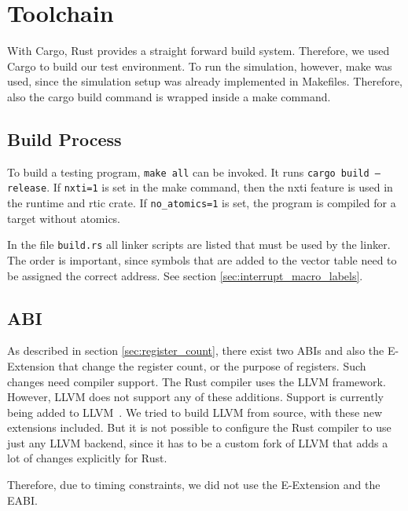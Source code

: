 \section{Toolchain}
With Cargo, Rust provides a straight forward build system. Therefore, we used Cargo to build our test environment. To run the simulation, however, make was used, since the simulation setup was already implemented in Makefiles. Therefore, also the cargo build command is wrapped inside a make command.

\subsection{Build Process}
To build a testing program, \texttt{make all} can be invoked.
It runs \texttt{cargo build ---release}.  If \texttt{nxti=1} is set in the make command, then the nxti feature is used in the runtime and \gls{rtic} crate. If \texttt{no_atomics=1} is set, the program is compiled for a target without atomics.

In the file \texttt{build.rs} all linker scripts are listed that must be used by the linker. The order is important, since symbols that are added to the vector table need to be assigned the correct address. See section \ref{sec:interrupt_macro_labels}.

\subsection{ABI}
As described in section \ref{sec:register_count}, there exist two ABIs and also the E-Extension that change the register count, or the purpose of registers. Such changes need compiler support.
The Rust compiler uses the LLVM framework. However, LLVM does not support any of these additions. Support is currently being added to LLVM~\cite{llvmRISCVEExtension}. We tried to build LLVM from source, with these new extensions included. But it is not possible to configure the Rust compiler to use just any LLVM backend, since it has to be a custom fork of LLVM that adds a lot of changes explicitly for Rust.

Therefore, due to timing constraints, we did not use the E-Extension and the EABI.